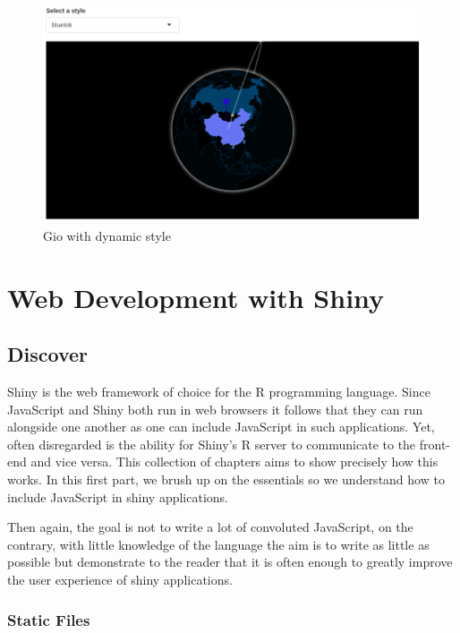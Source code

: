 \documentclass[
]{krantz}
\begin{document}
\begin{figure}
\centering
\includegraphics{images/gio-shiny-style.png}
\caption{Gio with dynamic style}
\end{figure}

\hypertarget{part-web-development-with-shiny}{%
\part{Web Development with Shiny}\label{part-web-development-with-shiny}}

\hypertarget{discover}{%
\chapter{Discover}\label{discover}}

Shiny is the web framework of choice for the R programming language. Since JavaScript and Shiny both run in web browsers it follows that they can run alongside one another as one can include JavaScript in such applications. Yet, often disregarded is the ability for Shiny's R server to communicate to the front-end and vice versa. This collection of chapters aims to show precisely how this works. In this first part, we brush up on the essentials so we understand how to include JavaScript in shiny applications.

Then again, the goal is not to write a lot of convoluted JavaScript, on the contrary, with little knowledge of the language the aim is to write as little as possible but demonstrate to the reader that it is often enough to greatly improve the user experience of shiny applications.

\hypertarget{static-files}{%
\section{Static Files}\label{static-files}}
\end{document}
